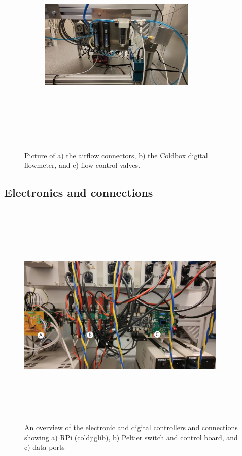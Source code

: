 \begin{figure}[h]
    \begin{subfigure}[b]{0.45\textwidth}
        \centering
        \includegraphics[width=7.5cm,height=10cm,keepaspectratio]{Figures/test/airflow-3.jpg}
        \caption{}\label{fig:airflow3}
    \end{subfigure}
    \caption{Picture of a) the airflow connectors, b) the Coldbox digital flowmeter, and c) flow control valves.}
    \label{fig:airflow}
\end{figure}

\newpage
\subsection{Electronics and connections}
\begin{figure}[h]
    \centering
    \includegraphics[width=10cm,height=11cm,keepaspectratio]{Figures/test/connections-5.jpg}
    \caption{An overview of the electronic and digital controllers and connections showing a) RPi (coldjiglib), b) Peltier switch and control board, and c) data ports}
    \label{fig:connections}
\end{figure}

